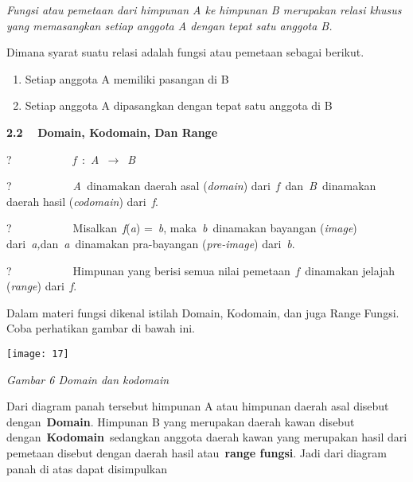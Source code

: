 \documentclass[11pt,fleqn]{book} %
\begin{document}
\noindent \textit{Fungsi atau pemetaan dari himpunan A ke himpunan B merupakan relasi khusus yang memasangkan setiap anggota A dengan tepat satu anggota B.}

\noindent Dimana syarat suatu relasi adalah fungsi atau pemetaan sebagai berikut.

\begin{enumerate}
\item  Setiap anggota A memiliki pasangan di B

\item  Setiap anggota A dipasangkan dengan tepat satu anggota di B
\end{enumerate}

\noindent 

\noindent 

\noindent 

\noindent 

\noindent \textbf{2.2 }~~\textbf{Domain, Kodomain, Dan Range}

\noindent \textbf{}

\noindent ?~~~~~~~~~~~\textit{f~}:~\textit{A~}$\mathrm{\to}$~\textit{B}

\noindent ?~~~~~~~~~~~\textit{A~}dinamakan daerah asal (\textit{domain}) dari~\textit{f~}dan~\textit{B~}dinamakan daerah hasil (\textit{codomain}) dari~\textit{f}.

\noindent ?~~~~~~~~~~~Misalkan~\textit{f}(\textit{a}) =~\textit{b}, maka~\textit{b~}dinamakan bayangan (\textit{image}) dari~\textit{a,}dan~\textit{a~}dinamakan pra-bayangan (\textit{pre-image}) dari~\textit{b}.

\noindent ?~~~~~~~~~~~Himpunan yang berisi semua nilai pemetaan~\textit{f~}dinamakan jelajah (\textit{range}) dari~\textit{f}.

\noindent 

\noindent Dalam materi fungsi dikenal istilah Domain, Kodomain, dan juga Range Fungsi. Coba perhatikan gambar di bawah ini.

\begin{center}
\noindent \texttt{[image: 17]}
\end{center}

\noindent \textit{Gambar 6 Domain dan kodomain}

\noindent 

\noindent Dari diagram panah tersebut himpunan A atau himpunan daerah asal disebut dengan~\textbf{Domain}. Himpunan B yang merupakan daerah kawan disebut dengan~\textbf{Kodomain}~sedangkan anggota daerah kawan yang merupakan hasil dari pemetaan disebut dengan daerah hasil atau~\textbf{range fungsi}. Jadi dari diagram panah di atas dapat disimpulkan
\end{document}
